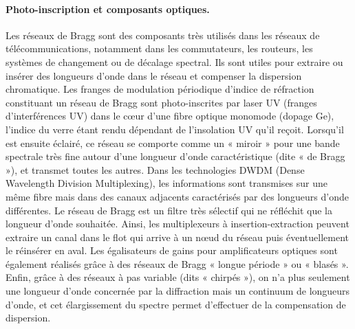 \paragraph{Photo-inscription et composants optiques.}
Les réseaux de Bragg sont des composants très utilisés dans les réseaux de
télécommunications, notamment dans les commutateurs, les routeurs, les systèmes
de changement ou de décalage spectral. Ils sont utiles pour extraire ou insérer
des longueurs d'onde dans le réseau et compenser la dispersion chromatique. Les
franges de modulation périodique d'indice de réfraction constituant un réseau de
Bragg sont photo-inscrites par laser UV (franges d'interférences UV) dans le
cœur d'une fibre optique monomode (dopage Ge), l'indice du verre étant rendu
dépendant de l'insolation UV qu'il reçoit. Lorsqu'il est ensuite éclairé, ce
réseau se comporte comme un « miroir » pour une bande spectrale très fine autour
d'une longueur d'onde caractéristique (dite « de Bragg »), et transmet toutes les
autres. Dans les technologies DWDM (Dense Wavelength Division Multiplexing), les
informations sont transmises sur une même fibre mais dans des canaux adjacents
caractérisés par des longueurs d'onde différentes. Le réseau de Bragg est un
filtre très sélectif qui ne réfléchit que la longueur d'onde souhaitée. Ainsi,
les multiplexeurs à insertion-extraction peuvent extraire un canal dans le flot
qui arrive à un nœud du réseau puis éventuellement le réinsérer en aval. Les
égalisateurs de gains pour amplificateurs optiques sont également réalisés grâce
à des réseaux de Bragg « longue période » ou « blasés ». Enfin, grâce à des
réseaux à pas variable (dits « chirpés »), on n'a plus seulement une longueur
d'onde concernée par la diffraction mais un continuum de longueurs d'onde, et
cet élargissement du spectre permet d'effectuer de la compensation de
dispersion.

